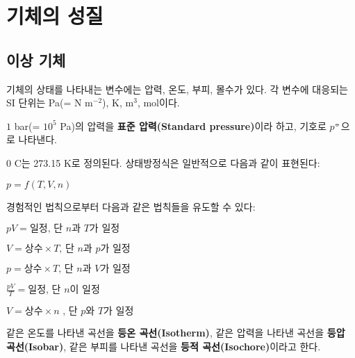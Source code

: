\chapter{기체의 성질}
        \section{이상 기체}
            \hspace{\parindent} 기체의 상태를 나타내는 변수에는 압력, 온도, 부피, 몰수가 있다. 각 변수에 대응되는 SI 단위는 \textrm{Pa(= N m$^{-2}$), K, m$^3$, mol}이다.
            \begin{defn}[표준 압력]
            $1$ \textrm{bar}(= $10^5$ \textrm{Pa})의 압력을 \textbf{표준 압력(Standard pressure)}이라 하고, 기호로 $p^{\circlehbar}$으로 나타낸다.
            \end{defn}
            $0$ \degree\textrm{C}는 273.15 \textrm{K}로 정의된다. 상태방정식은 일반적으로 다음과 같이 표현된다:
                \begin{defn}[상태방정식]
                    $p = f \left( T,V,n \right)$
                \end{defn}
            경험적인 법칙으로부터 다음과 같은 법칙들을 유도할 수 있다:
                \begin{obs}[Boyle의 법칙]
                    $pV = \text{일정, 단 }n \text{과 }T \text{가 일정}$
                \end{obs}
                \begin{obs}[Charles의 법칙(1)]
                    $V = \text{상수} \times T \text{, 단 }n \text{과 }p \text{가 일정}$
                \end{obs}
                \begin{obs}[Charles의 법칙(2)]
                    $p = \text{상수} \times T \text{, 단 }n \text{과 }V \text{가 일정}$
                \end{obs}
                \begin{obs}
                    $\displaystyle\frac{pV}{T} = \text{일정, 단 }n \text{이 일정}$
                \end{obs}
                \begin{obs}[Avogadro의 법칙]
                    $V = \text{상수} \times n \text{ , 단 }p \text{와 } T \text{가 일정}$
                \end{obs}
            같은 온도를 나타낸 곡선을 \textbf{등온 곡선(Isotherm)}, 같은 압력을 나타낸 곡선을 \textbf{등압 곡선(Isobar)}, 
            같은 부피를 나타낸 곡선을 \textbf{등적 곡선(Isochore)}이라고 한다.\\
